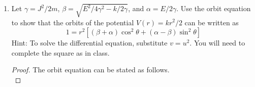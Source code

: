 \documentclass[../psets.tex]{subfiles}
\begin{document}
\begin{enumerate}
\begin{enumerate}
\begin{proof}
\begin{figure}[H]
\begin{subfigure}[b]{0.25\linewidth}
                    \caption{$k<0$.}
                \end{subfigure}
            \end{figure}
            Evidently, when  and \par
            In the attractive case, we can calculate $U_\text{min}$ by setting the first derivative equal to zero, solving for the corresponding $r$ value, and returning the substitution. Let's begin. The corresponding $r$ value is
            \begin{align*}
                0 &= \dv{U}{r}\\
                &= -\frac{J^2}{mr^3}+kr\\
                \frac{J^2}{mk} &= r^4\\
                r &= \sqrt[4]{\frac{J^2}{mk}}
            \end{align*}
            Returning the substitution, we find that
            \begin{align*}
                U_\text{min} &= U\left( \sqrt[4]{\frac{J^2}{mk}} \right)\\
                &= \frac{J^2}{2m\left( \sqrt[4]{\frac{J^2}{mk}} \right)^2}+\frac{1}{2}k\left( \sqrt[4]{\frac{J^2}{mk}} \right)^2\\
                \Aboxed{U_\text{min} &= J\sqrt{\frac{k}{m}}}
            \end{align*}
            At $E=U_\text{min}$, 
        \end{proof}
        \item Let $\gamma=J^2/2m$, $\beta=\sqrt{E^2/4\gamma^2-k/2\gamma}$, and $\alpha=E/2\gamma$. Use the orbit equation to show that the orbits of the potential $V(r)=kr^2/2$ can be written as
        \begin{equation*}
            1 = r^2[(\beta+\alpha)\cos^2\theta+(\alpha-\beta)\sin^2\theta]
        \end{equation*}
        Hint: To solve the differential equation, substitute $v=u^2$. You will need to complete the square as in class.
        \begin{proof}
            The orbit equation can be stated as follows.
            \begin{equation*}

\end{equation*}
\end{proof}
\end{enumerate}
\end{enumerate}
\end{document}
